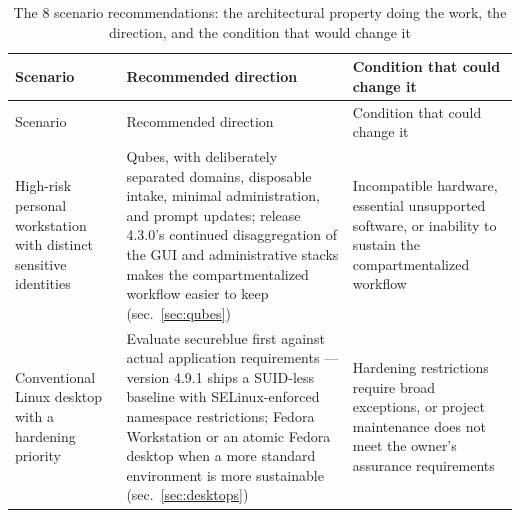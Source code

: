 \documentclass[
  english,
  9pt,
]{extarticle}
\begin{document}
\begin{longtable}[]{@{}
  >{\raggedright\arraybackslash}p{}
  >{\raggedright\arraybackslash}p{}
  >{\raggedright\arraybackslash}p{}@{}}
\caption{The 8 scenario recommendations: the architectural property
doing the work, the direction, and the condition that would change
it}\label{tbl:scenarios}\tabularnewline
\toprule\noalign{}
\begin{minipage}[b]{\linewidth}\raggedright
Scenario
\end{minipage} & \begin{minipage}[b]{\linewidth}\raggedright
Recommended direction
\end{minipage} & \begin{minipage}[b]{\linewidth}\raggedright
Condition that could change it
\end{minipage} \\
\midrule\noalign{}
\endfirsthead
\toprule\noalign{}
\begin{minipage}[b]{\linewidth}\raggedright
Scenario
\end{minipage} & \begin{minipage}[b]{\linewidth}\raggedright
Recommended direction
\end{minipage} & \begin{minipage}[b]{\linewidth}\raggedright
Condition that could change it
\end{minipage} \\
\midrule\noalign{}
\endhead
\bottomrule\noalign{}
\endlastfoot
High-risk personal workstation with distinct sensitive identities &
Qubes, with deliberately separated domains, disposable intake, minimal
administration, and prompt updates; release 4.3.0's continued
disaggregation of the GUI and administrative stacks makes the
compartmentalized workflow easier to keep (sec.~\ref{sec:qubes}) &
Incompatible hardware, essential unsupported software, or inability to
sustain the compartmentalized workflow \\
Conventional Linux desktop with a hardening priority & Evaluate
secureblue first against actual application requirements --- version
4.9.1 ships a SUID-less baseline with SELinux-enforced namespace
restrictions; Fedora Workstation or an atomic Fedora desktop when a more
standard environment is more sustainable (sec.~\ref{sec:desktops}) &
Hardening restrictions require broad exceptions, or project maintenance
does not meet the owner's assurance requirements \\

\end{longtable}
\end{document}
